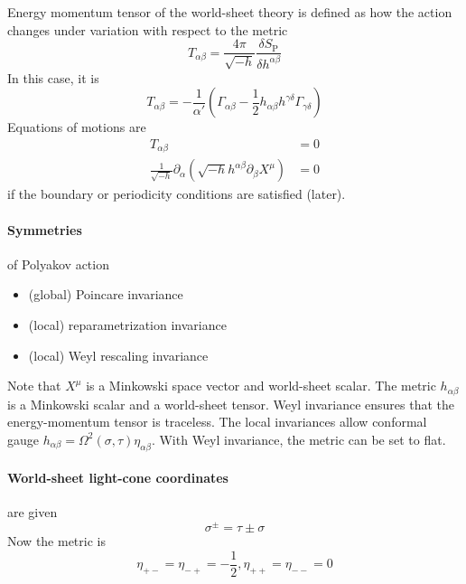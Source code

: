 \documentclass[12pt, a4paper, DIV=15]{article}
\numberwithin{equation}{section}
\begin{document}
Energy momentum tensor of the world-sheet theory is defined as how the action changes under variation with respect to the metric
\begin{equation}
	T_{\alpha\beta} = \frac{4\pi }{\sqrt{-h}} \frac{\delta S_\text{P}}{\delta h^{\alpha\beta}}
\end{equation}
In this case, it is 
\begin{equation}
	T_{\alpha\beta} = - \frac{1}{\alpha' } \left( \Gamma_{\alpha\beta} - \frac{1}{2}h_{\alpha\beta} h^{\gamma\delta} \Gamma_{\gamma\delta} \right)
\end{equation}
Equations of motions are
\begin{subequations}
\begin{align}
	T_{\alpha\beta} &= 0 \\
	\frac{1}{\sqrt{-h}} \partial_\alpha \left( \sqrt{-h}h^{\alpha\beta} \partial_\beta X^\mu \right) &= 0
\end{align}
\end{subequations}
if the boundary or periodicity conditions are satisfied (later).

\paragraph{Symmetries} of Polyakov action
\begin{itemize}
	\item (global) Poincare invariance
	\item (local) reparametrization invariance
	\item (local) Weyl rescaling invariance
\end{itemize}
Note that $X^\mu$ is a Minkowski space vector and world-sheet scalar. The metric $h_{\alpha\beta}$ is a Minkowski scalar and a world-sheet tensor. Weyl invariance ensures that the energy-momentum tensor is traceless. The local invariances allow conformal gauge $h_{\alpha\beta} = \Omega^2(\sigma,\tau) \eta_{\alpha\beta}$. With Weyl invariance, the metric can be set to flat.

\paragraph{World-sheet light-cone coordinates}
are given
\begin{equation}
	\sigma^\pm = \tau \pm \sigma
\end{equation}
Now the metric is
\begin{equation}
	\eta_{+-} = \eta_{-+} = - \frac{1}{2}, \eta_{++} = \eta_{--} = 0
\end{equation}
\end{document}
